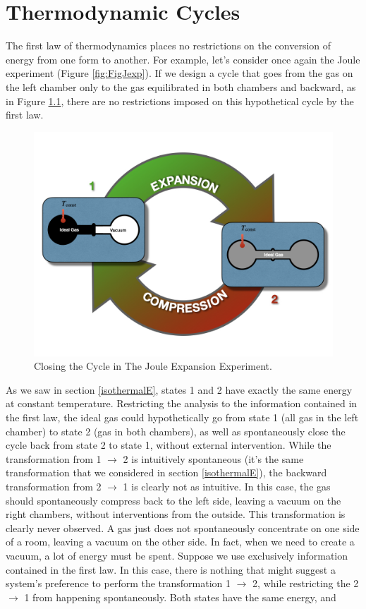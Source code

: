 \documentclass[
]{book}
\theoremstyle{definition}
\theoremstyle{definition}
\theoremstyle{definition}
\theoremstyle{remark}
\begin{document}
\hypertarget{ThermodynamicCycles}{%
\chapter{Thermodynamic Cycles}\label{ThermodynamicCycles}}

The first law of thermodynamics places no restrictions on the conversion of energy from one form to another. For example, let's consider once again the Joule experiment (Figure \ref{fig:FigJexp}). If we design a cycle that goes from the gas on the left chamber only to the gas equilibrated in both chambers and backward, as in Figure \ref{fig:FigJexpC}, there are no restrictions imposed on this hypothetical cycle by the first law.

\begin{figure}

{\centering \includegraphics[width=0.8\linewidth]{./img/OEP_Figures.008} 

}

\caption{Closing the Cycle in The Joule Expansion Experiment.}\label{fig:FigJexpC}
\end{figure}

As we saw in section \ref{isothermalE}, states 1 and 2 have exactly the same energy at constant temperature. Restricting the analysis to the information contained in the first law, the ideal gas could hypothetically go from state 1 (all gas in the left chamber) to state 2 (gas in both chambers), as well as spontaneously close the cycle back from state 2 to state 1, without external intervention. While the transformation from 1 \(\rightarrow\) 2 is intuitively spontaneous (it's the same transformation that we considered in section \ref{isothermalE}), the backward transformation from 2 \(\rightarrow\) 1 is clearly not as intuitive. In this case, the gas should spontaneously compress back to the left side, leaving a vacuum on the right chambers, without interventions from the outside. This transformation is clearly never observed. A gas just does not spontaneously concentrate on one side of a room, leaving a vacuum on the other side. In fact, when we need to create a vacuum, a lot of energy must be spent. Suppose we use exclusively information contained in the first law. In this case, there is nothing that might suggest a system's preference to perform the transformation 1 \(\rightarrow\) 2, while restricting the 2 \(\rightarrow\) 1 from happening spontaneously. Both states have the same energy, and
\end{document}
